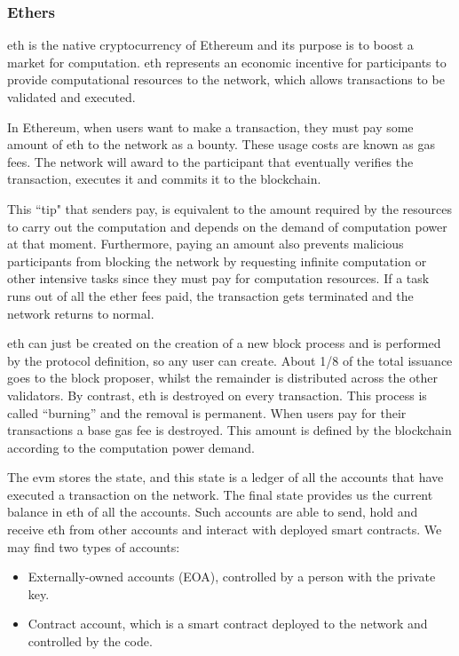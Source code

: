 \subsubsection{Ethers}
{\acrfull{eth} is the native cryptocurrency of Ethereum and its purpose is to boost a market for computation. \acrshort{eth} represents an economic incentive for participants to provide computational resources to the network, which allows transactions to be validated and executed.

In Ethereum, when users want to make a transaction, they must pay some amount of \acrshort{eth} to the network as a bounty. These usage costs are known as gas fees. The network will award to the participant that eventually verifies the transaction, executes it and commits it to the blockchain.

This ``\gls{tip}" that senders pay, is equivalent to the amount required by the resources to carry out the computation and depends on the demand of computation power at that moment. Furthermore, paying an amount also prevents malicious participants from blocking the network by requesting infinite computation or other intensive tasks since they must pay for computation resources. If a task runs out of all the ether fees paid, the transaction gets terminated and the network returns to normal.

\acrlong{eth} can just be created on the creation of a new block process and is performed by the protocol definition, so any user can create. About 1/8 of the total issuance goes to the block proposer, whilst the remainder is distributed across the other validators. By contrast, \acrlong{eth} is destroyed on every transaction. This process is called ``burning'' and the removal is permanent. When users pay for their transactions a base gas fee is destroyed. This amount is defined by the blockchain according to the computation power demand.

The \acrshort{evm} stores the state, and this state is a ledger of all the accounts that have executed a transaction on the network. The final state provides us the current balance in \acrshort{eth} of all the accounts. Such accounts are able to send, hold and receive \acrshort{eth} from other accounts and interact with deployed smart contracts. We may find two types of accounts:
\begin{itemize}
    \item Externally-owned accounts (EOA), controlled by a person with the private key.
    \item Contract account, which is a smart contract deployed to the network and controlled by the code.
\end{itemize}
}

